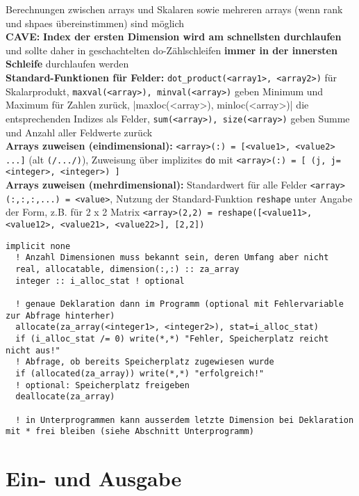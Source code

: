 \documentclass[a4paper, twocolumn]{scrarticle}
\begin{document}
Berechnungen zwischen arrays und Skalaren sowie mehreren arrays (wenn rank und shpaes übereinstimmen) sind möglich\\
\textbf{CAVE:} \textbf{Index der ersten Dimension wird am schnellsten durchlaufen} und sollte daher in geschachtelten do-Zählschleifen \textbf{immer in der innersten Schleife} durchlaufen werden\\
\textbf{Standard-Funktionen für Felder:} \lstinline|dot_product(<array1>, <array2>)| für Skalarprodukt, \lstinline|maxval(<array>), minval(<array>)| geben Minimum und Maximum für Zahlen zurück, \listline|maxloc(<array>), minloc(<array>)| die entsprechenden Indizes als Felder, \lstinline|sum(<array>), size(<array>)| geben Summe und Anzahl aller Feldwerte zurück\\
\textbf{Arrays zuweisen (eindimensional):} \lstinline|<array>(:) = [<value1>, <value2> ...]| (alt \lstinline|(/.../)|), Zuweisung über implizites \lstinline|do| mit \lstinline|<array>(:) = [ (j, j=<integer>, <integer>) ]|\\
\textbf{Arrays zuweisen (mehrdimensional):} Standardwert für alle Felder \lstinline|<array>(:,:,:,...) = <value>|, Nutzung der Standard-Funktion \lstinline|reshape| unter Angabe der Form, z.B. für 2 x 2 Matrix \lstinline|<array>(2,2) = reshape([<value11>, <value12>, <value21>, <value22>], [2,2])|
\begin{lstlisting}[caption={\bfseries Allocatable Arrays (Genaue Größe nicht bei Deklaration bekannt)}]
  implicit none
  ! Anzahl Dimensionen muss bekannt sein, deren Umfang aber nicht
  real, allocatable, dimension(:,:) :: za_array
  integer :: i_alloc_stat ! optional
  
  ! genaue Deklaration dann im Programm (optional mit Fehlervariable zur Abfrage hinterher)
  allocate(za_array(<integer1>, <integer2>), stat=i_alloc_stat)
  if (i_alloc_stat /= 0) write(*,*) "Fehler, Speicherplatz reicht nicht aus!"
  ! Abfrage, ob bereits Speicherplatz zugewiesen wurde
  if (allocated(za_array)) write(*,*) "erfolgreich!"
  ! optional: Speicherplatz freigeben
  deallocate(za_array)

  ! in Unterprogrammen kann ausserdem letzte Dimension bei Deklaration mit * frei bleiben (siehe Abschnitt Unterprogramm)
\end{lstlisting}

\section{Ein- und Ausgabe}
\end{document}
